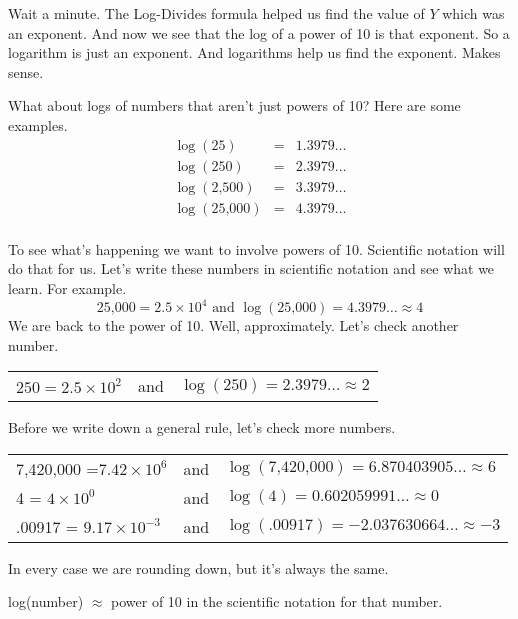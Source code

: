 Wait a minute.  The Log-Divides formula helped us find the value of $Y$ which was an exponent.   And now we see that the log of a power of 10 is that exponent.  So a logarithm is just an exponent. And logarithms help us find the exponent.  Makes sense.

What about logs of numbers that aren't just powers of 10? Here are some examples.
\begin{eqnarray*}
\log (25) & = & 1.3979\ldots \\
\log (250) & = & 2.3979\ldots \\
\log (\text{2,500}) & = & 3.3979\ldots \\
\log (\text{25,000}) & = & 4.3979\ldots \\
\end{eqnarray*}
\vspace{-.5in} %

To see what's happening we want to involve powers of 10.  Scientific notation will do that for us.  Let's write these numbers in scientific notation and see what we learn.  For example.
$$ \text{25,000} = 2.5 \times 10^4 \text{ and } \log( \text{25,000})=4.3979\ldots \approx 4$$
We are back to the power of 10.  Well, approximately.  Let's check another number.
\begin{center}
\begin{tabular} {lcl}
$250=2.5 \times 10^2$ & and & $\log(\text{250})=2.3979\ldots \approx 2$ \\
\end{tabular}
\end{center}

Before we write down a general rule, let's check more numbers.
\begin{center}
\begin{tabular} {lcl}
7,420,000 =$7.42 \times 10^6$ & and & $\log(\text{7,420,000})=6.870403905\ldots \approx 6$ \\
4 = $4 \times 10^0$ & and & $\log (\text{4})=0.602059991\ldots \approx 0$ \\
.00917 =  $9.17 \times 10^{-3}$ & and & $\log (\text{.00917})=-2.037630664\ldots \approx -3$\\
\end{tabular}
\end{center}
In every case we are rounding down, but it's always the same.

\begin{center}
log(number) $\approx$ power of 10 in the scientific notation for that number.
\end{center}

